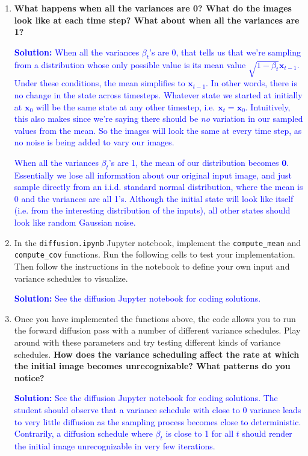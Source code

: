\documentclass{article}
\begin{document}
\begin{enumerate}
\item
\textbf{What happens when all the variances are 0? What do the images look like at each time step? What about when all the variances are 1?}

\textcolor{blue}{
    \textbf{Solution: } 
    When all the variances $\beta_t$'s are 0, that tells us that we're sampling from a distribution whose only possible value is its mean value $\sqrt{1-\beta_t}\mathbf{x}_{t-1}$. Under these conditions, the mean simplifies to $\mathbf{x}_{t-1}$. In other words, there is no change in the state across timesteps. Whatever state we started at initially at $\mathbf{x}_0$ will be the same state at any other timestep, i.e. $\mathbf{x}_t=\mathbf{x}_0$. Intuitively, this also makes since we're saying there should be \textit{no} variation in our sampled values from the mean. So the images will look the same at every time step, as no noise is being added to vary our images.
}

\textcolor{blue}{
    When all the variances $\beta_t$'s are 1, the mean of our distribution becomes $\mathbf{0}$. Essentially we lose all information about our original input image, and just sample directly from an i.i.d. standard normal distribution, where the mean is 0 and the variances are all 1's. Although the initial state will look like itself (i.e. from the interesting distribution of the inputs), all other states should look like random Gaussian noise.
}

\item
In the \verb|diffusion.ipynb| Jupyter notebook, implement the \verb|compute_mean| and \verb|compute_cov| functions. Run the following cells to test your implementation. Then follow the instructions in the notebook to define your own input and variance schedules to visualize.

\textcolor{blue}{
    \textbf{Solution: } 
    See the diffusion Jupyter notebook for coding solutions.
}

\item
Once you have implemented the functions above, the code allows you to run the forward diffusion pass with a number of different variance schedules. Play around with these parameters and try testing different kinds of variance schedules. \textbf{How does the variance scheduling affect the rate at which the initial image becomes unrecognizable? What patterns do you notice?}

\textcolor{blue}{
    \textbf{Solution: } 
    See the diffusion Jupyter notebook for coding solutions.
    The student should observe that a variance schedule with close to 0 variance leads to very little diffusion as the sampling process becomes close to deterministic. Contrarily, a diffusion schedule where $\beta_t$ is close to 1 for all $t$ should render the initial image unrecognizable in very few iterations.
}


\end{enumerate}
\end{document}
